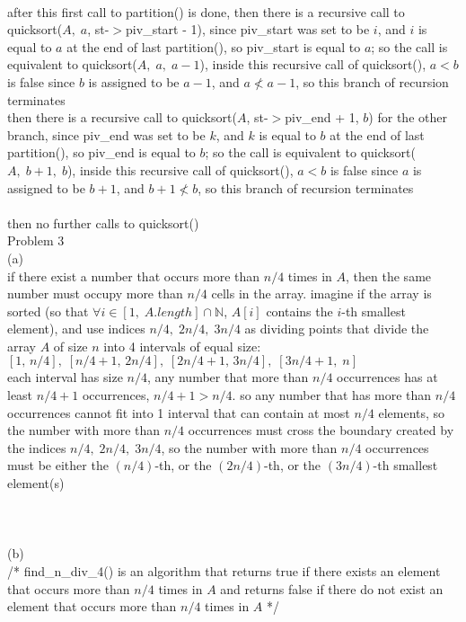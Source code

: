 \documentclass[12pt,border=4pt,multi]{article}%
\begin{document}
\\
after this first call to partition() is done, then there is a recursive call to  quicksort($A,\;a$, st-$>$piv\_start - 1), since piv\_start was set to be $i$, and $i$ is equal to $a$ at the end of last partition(), so piv\_start is equal to $a$; so the call is equivalent to quicksort($A,\; a,\; a - 1$), inside this recursive call of quicksort(), $a < b$ is false since $b$ is assigned to be $a - 1$, and $a \not< a - 1$, so this branch of recursion terminates\\
then there is a recursive call to  quicksort($A$, st-$>$piv\_end + 1, $b$) for the other branch, since piv\_end was set to be $k$, and $k$ is equal to $b$ at the end of last partition(), so piv\_end is equal to $b$; so the call is equivalent to quicksort($A,\; b + 1,\; b$), inside this recursive call of quicksort(), $a < b$ is false since $a$ is assigned to be $b + 1$, and $b + 1 \not< b$, so this branch of recursion terminates\\
\\
then no further calls to quicksort()\\
\newpage
\noindent
Problem 3\\
(a)\\
if there exist a number that occurs more than $n/4$ times in $A$, then the same number must occupy more than $n / 4$ cells in the array. imagine if the array is sorted (so that $\forall i \in [1,\;A.length] \cap \mathbb{N}$, $A[i]$ contains the $i$-th smallest element), and use indices $n / 4,\; 2n / 4,\; 3n / 4$ as dividing points that divide the array $A$ of size $n$ into 4 intervals of equal size:\\
$[1,\,n/4],\;[n/4 + 1,\,2n/4],\;[2n/4 + 1,\, 3n/4],\;[3n/4 + 1,\; n]$\\
each interval has size $n / 4$, any number that more than $n / 4$ occurrences has at least $n / 4 + 1$ occurrences, $n / 4 + 1 > n / 4$. so any number that has more than $n / 4$ occurrences cannot fit into 1 interval that can contain at most $n / 4$ elements, so the number with more than $n / 4$ occurrences must cross the boundary created by the indices $n / 4,\; 2n / 4,\; 3n / 4$, so the number with more than $n / 4$ occurrences must be either the $(n/4)$-th, or the $(2n/4)$-th, or the $(3n/4)$-th smallest element(s)\\ 
\\
\\
\\
(b)\\
/* find\_n\_div\_4() is an algorithm that returns true if there exists an element that occurs more than $n/4$ times in $A$ and returns false if there do not exist an element that occurs more than $n/4$ times in $A$ */
\end{document}
